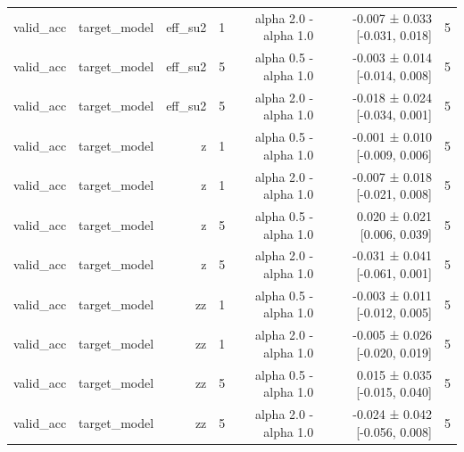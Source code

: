 \begin{table}
\begin{tabular}{lrrrrrr}
valid\_acc & target\_model & eff\_su2 & 1 & alpha 2.0 - alpha 1.0 & -0.007 ± 0.033 [-0.031, 0.018] & 5 \\
valid\_acc & target\_model & eff\_su2 & 5 & alpha 0.5 - alpha 1.0 & -0.003 ± 0.014 [-0.014, 0.008] & 5 \\
valid\_acc & target\_model & eff\_su2 & 5 & alpha 2.0 - alpha 1.0 & -0.018 ± 0.024 [-0.034, 0.001] & 5 \\
valid\_acc & target\_model & z & 1 & alpha 0.5 - alpha 1.0 & -0.001 ± 0.010 [-0.009, 0.006] & 5 \\
valid\_acc & target\_model & z & 1 & alpha 2.0 - alpha 1.0 & -0.007 ± 0.018 [-0.021, 0.008] & 5 \\
valid\_acc & target\_model & z & 5 & alpha 0.5 - alpha 1.0 & 0.020 ± 0.021 [0.006, 0.039] & 5 \\
valid\_acc & target\_model & z & 5 & alpha 2.0 - alpha 1.0 & -0.031 ± 0.041 [-0.061, 0.001] & 5 \\
valid\_acc & target\_model & zz & 1 & alpha 0.5 - alpha 1.0 & -0.003 ± 0.011 [-0.012, 0.005] & 5 \\
valid\_acc & target\_model & zz & 1 & alpha 2.0 - alpha 1.0 & -0.005 ± 0.026 [-0.020, 0.019] & 5 \\
valid\_acc & target\_model & zz & 5 & alpha 0.5 - alpha 1.0 & 0.015 ± 0.035 [-0.015, 0.040] & 5 \\
valid\_acc & target\_model & zz & 5 & alpha 2.0 - alpha 1.0 & -0.024 ± 0.042 [-0.056, 0.008] & 5 \\
\bottomrule
\end{tabular}
\end{table}


